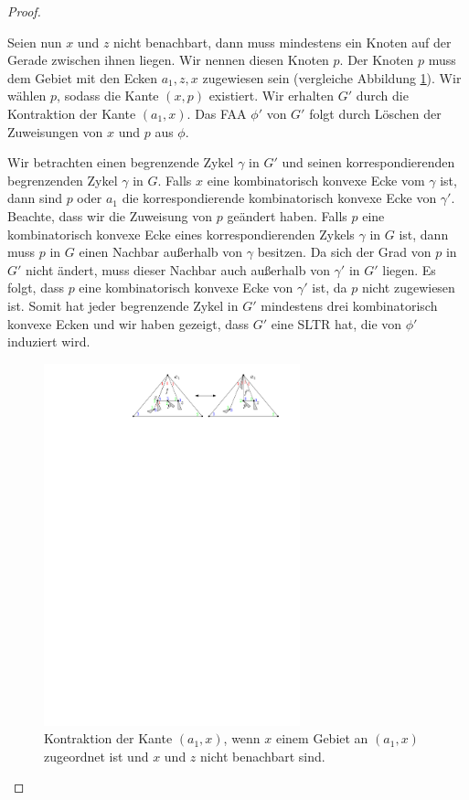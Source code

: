 \begin{proof}
\begin{description}[leftmargin =0pt, font = \rmfamily ,listparindent=\parindent,parsep=0pt]
\item[Fall 2:] Seien nun $x$ und $z$ nicht benachbart, dann muss mindestens ein Knoten auf der Gerade zwischen ihnen liegen. Wir nennen diesen Knoten $p$. Der Knoten $p$ muss dem Gebiet mit den Ecken $a_1,z,x$ zugewiesen sein (vergleiche Abbildung \ref{pic_lem5_10}). Wir wählen $p$, sodass die Kante $(x,p)$ existiert. Wir erhalten $G'$ durch die Kontraktion der Kante $(a_1,x)$. Das FAA $\phi'$ von $G'$ folgt durch Löschen der Zuweisungen von $x$ und $p$ aus $\phi$.

Wir betrachten einen begrenzende Zykel $\gamma$ in $G'$ und seinen korrespondierenden begrenzenden Zykel $\gamma$ in $G$. Falls $x$ eine kombinatorisch konvexe Ecke vom $\gamma$ ist, dann sind $p$ oder $a_1$ die korrespondierende kombinatorisch konvexe Ecke von $\gamma'$. Beachte, dass wir die Zuweisung von $p$ geändert haben. Falls $p$ eine kombinatorisch konvexe Ecke eines korrespondierenden Zykels $\gamma$ in $G$ ist, dann muss $p$ in $G$ einen Nachbar außerhalb von $\gamma$ besitzen. Da sich der Grad von $p$ in $G'$ nicht ändert, muss dieser Nachbar auch außerhalb von $\gamma'$ in $G'$ liegen. Es folgt, dass $p$ eine kombinatorisch konvexe Ecke von $\gamma'$ ist, da $p$ nicht zugewiesen ist. Somit hat jeder begrenzende Zykel in $G'$ mindestens drei kombinatorisch konvexe Ecken und wir haben gezeigt, dass $G'$ eine SLTR hat, die von $\phi'$ induziert wird.

\begin{figure}
\centering
\includegraphics[width=0.66\textwidth]{lem5_10.pdf}
\caption{Kontraktion der Kante $(a_1,x)$, wenn $x$ einem Gebiet an $(a_1,x)$ zugeordnet ist und $x$ und $z$ nicht benachbart sind.}
\label{pic_lem5_10}
\end{figure}


\end{description}
\end{proof}
